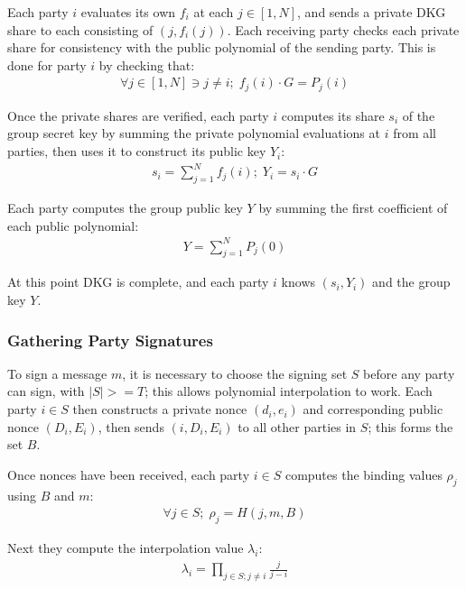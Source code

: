 \documentclass{article}
\theoremstyle{definition}
\theoremstyle{remark}
\begin{document}
Each party $i$ evaluates its own $f_i$ at each $j \in [1,N]$, and sends a private DKG share to each consisting of $(j, f_i(j))$.  Each receiving party checks each private share for consistency with the public polynomial of the sending party.  This is done for party $i$ by checking that:
\begin{align}\label{equation:public-commitment-verification}
  \forall j \in [1,N] \ni j \neq i;\;f_j(i) \cdot G = P_j(i)
\end{align}

Once the private shares are verified, each party $i$ computes its share $s_i$ of the group secret key by summing the private polynomial evaluations at $i$ from all parties, then uses it to construct its public key $Y_i$:
\begin{align}\label{equation:secret-share-definition}
  s_i = \sum_{j=1}^{N} f_j(i) ;\; Y_i = s_i \cdot G
\end{align}

Each party computes the group public key $Y$ by summing the first coefficient of each public polynomial:
\begin{align}
  Y = \sum_{j=1}^{N} P_j(0)
\end{align}

At this point DKG is complete, and each party $i$ knows $(s_i, Y_i)$ and the group key $Y$.

\newpage
\onecolumn
\subsubsection{
  Gathering Party Signatures
}

To sign a message $m$, it is necessary to choose the signing set $S$ before any party can sign, with $|S| >= T$; this allows polynomial interpolation to work.  Each party $i \in S$ then constructs a private nonce $(d_i,e_i)$ and corresponding public nonce $(D_i,E_i)$, then sends $(i, D_i, E_i)$ to all other parties in $S$; this forms the set $B$.

Once nonces have been received, each party $i \in S$ computes the binding values $\rho_j$ using $B$ and $m$:
\begin{align}
  \forall j \in S;\;\rho_j = H(j, m, B)
\end{align}

Next they compute the interpolation value $\lambda_i$:
\begin{align}
  \lambda_i = \prod_{j \in S; j \neq i}^{} \frac{j}{j - i}
\end{align}
\end{document}
